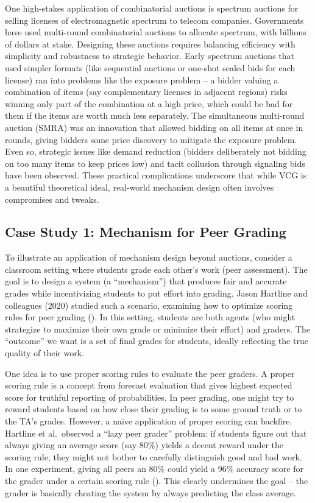 \documentclass[
  letterpaper,
  numbers=noenddot,
  DIV=11]{scrreprt}
\theoremstyle{plain}
\theoremstyle{definition}
\theoremstyle{remark}
\begin{document}
One high-stakes application of combinatorial auctions is spectrum
auctions for selling licenses of electromagnetic spectrum to telecom
companies. Governments have used multi-round combinatorial auctions to
allocate spectrum, with billions of dollars at stake. Designing these
auctions requires balancing efficiency with simplicity and robustness to
strategic behavior. Early spectrum auctions that used simpler formats
(like sequential auctions or one-shot sealed bids for each license) ran
into problems like the exposure problem -- a bidder valuing a
combination of items (say complementary licenses in adjacent regions)
risks winning only part of the combination at a high price, which could
be bad for them if the items are worth much less separately. The
simultaneous multi-round auction (SMRA) was an innovation that allowed
bidding on all items at once in rounds, giving bidders some price
discovery to mitigate the exposure problem. Even so, strategic issues
like demand reduction (bidders deliberately not bidding on too many
items to keep prices low) and tacit collusion through signaling bids
have been observed. These practical complications underscore that while
VCG is a beautiful theoretical ideal, real-world mechanism design often
involves compromises and tweaks.

\subsection{Case Study 1: Mechanism for Peer
Grading}\label{case-study-1-mechanism-for-peer-grading}

To illustrate an application of mechanism design beyond auctions,
consider a classroom setting where students grade each other's work
(peer assessment). The goal is to design a system (a ``mechanism'') that
produces fair and accurate grades while incentivizing students to put
effort into grading. Jason Hartline and colleagues (2020) studied such a
scenario, examining how to optimize scoring rules for peer grading
(). In this setting,
students are both agents (who might strategize to maximize their own
grade or minimize their effort) and graders. The ``outcome'' we want is
a set of final grades for students, ideally reflecting the true quality
of their work.

One idea is to use proper scoring rules to evaluate the peer graders. A
proper scoring rule is a concept from forecast evaluation that gives
highest expected score for truthful reporting of probabilities. In peer
grading, one might try to reward students based on how close their
grading is to some ground truth or to the TA's grades. However, a naive
application of proper scoring can backfire. Hartline et al.~observed a
``lazy peer grader'' problem: if students figure out that always giving
an average score (say 80\%) yields a decent reward under the scoring
rule, they might not bother to carefully distinguish good and bad work.
In one experiment, giving all peers an 80\% could yield a 96\% accuracy
score for the grader under a certain scoring rule
(). This clearly
undermines the goal -- the grader is basically cheating the system by
always predicting the class average.
\end{document}
